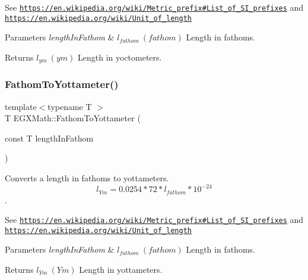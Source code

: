 See \href{https://en.wikipedia.org/wiki/Metric_prefix#List_of_SI_prefixes}{\tt https\+://en.\+wikipedia.\+org/wiki/\+Metric\+\_\+prefix\#\+List\+\_\+of\+\_\+\+S\+I\+\_\+prefixes} and \href{https://en.wikipedia.org/wiki/Unit_of_length}{\tt https\+://en.\+wikipedia.\+org/wiki/\+Unit\+\_\+of\+\_\+length} 
\begin{DoxyParams}{Parameters}
{\em length\+In\+Fathom} & $ l_{fathom}\ (fathom)$ Length in fathoms. \\
\hline
\end{DoxyParams}
\begin{DoxyReturn}{Returns}
$ l_{ym}\ (ym)$ Length in yoctometers. 
\end{DoxyReturn}
\mbox{\label{group___e_g_x_math-_conversions-_length_conversions-_nautical-_fathom-_s_i_ga0f5e5e4cd705f904b759f069f8926aa3}} 
\subsubsection{\texorpdfstring{Fathom\+To\+Yottameter()}{FathomToYottameter()}}
{\footnotesize\ttfamily template$<$typename T $>$ \\
T E\+G\+X\+Math\+::\+Fathom\+To\+Yottameter (\begin{DoxyParamCaption}\item[{const T}]{length\+In\+Fathom }\end{DoxyParamCaption})}



Converts a length in fathoms to yottameters. \[ l_{Ym}=0.0254 * 72 * l_{fathom} * 10^{-24} \]. 

See \href{https://en.wikipedia.org/wiki/Metric_prefix#List_of_SI_prefixes}{\tt https\+://en.\+wikipedia.\+org/wiki/\+Metric\+\_\+prefix\#\+List\+\_\+of\+\_\+\+S\+I\+\_\+prefixes} and \href{https://en.wikipedia.org/wiki/Unit_of_length}{\tt https\+://en.\+wikipedia.\+org/wiki/\+Unit\+\_\+of\+\_\+length} 
\begin{DoxyParams}{Parameters}
{\em length\+In\+Fathom} & $ l_{fathom}\ (fathom)$ Length in fathoms. \\
\hline
\end{DoxyParams}
\begin{DoxyReturn}{Returns}
$ l_{Ym}\ (Ym)$ Length in yottameters. 
\end{DoxyReturn}
\mbox{\label{group___e_g_x_math-_conversions-_length_conversions-_nautical-_fathom-_s_i_ga2ce11498768b6c37b65bce7b6915d153}} 
